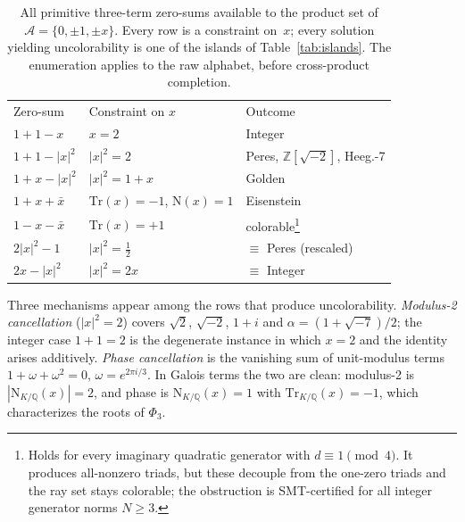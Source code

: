 \documentclass[twocolumn,prl,superscriptaddress,nofootinbib]{revtex4-2}
\newcommand{\Z}{\mathbb{Z}}
\newcommand{\Q}{\mathbb{Q}}
\newcommand{\Norm}{\mathrm{N}}
\newcommand{\Tr}{\mathrm{Tr}}
\begin{document}
\begin{table}[b]
\caption{\label{tab:zerosum}All primitive three-term zero-sums available to the
product set of $\mathcal{A}=\{0,\pm1,\pm x\}$.  Every row is a constraint
on~$x$; every solution yielding uncolorability is one of the islands of
Table~\ref{tab:islands}.  The enumeration applies to the raw alphabet, before
cross-product completion.}
\begin{ruledtabular}
\begin{tabular}{lll}
Zero-sum & Constraint on $x$ & Outcome \\
\colrule
$1+1-x$            & $x=2$                    & Integer \\
$1+1-|x|^2$        & $|x|^2=2$                & Peres, $\Z[\sqrt{-2}]$, Heeg.-7 \\
$1+x-|x|^2$        & $|x|^2=1+x$              & Golden \\
$1+x+\bar x$       & $\Tr(x)=-1$, $\Norm(x)=1$ & Eisenstein \\
$1-x-\bar x$       & $\Tr(x)=+1$              & colorable\footnote{Holds for
every imaginary quadratic generator with $d \equiv 1 \pmod 4$.  It produces
all-nonzero triads, but these decouple from the one-zero triads and the ray set
stays colorable; the obstruction is SMT-certified for all integer generator
norms $N \geq 3$.} \\
$2|x|^2-1$         & $|x|^2=\tfrac12$         & $\equiv$ Peres (rescaled) \\
$2x-|x|^2$         & $|x|^2=2x$               & $\equiv$ Integer \\
\end{tabular}
\end{ruledtabular}
\end{table}

Three mechanisms appear among the rows that produce uncolorability.
\emph{Modulus-2 cancellation} ($|x|^2=2$) covers $\sqrt2$, $\sqrt{-2}$, $1+i$ and
$\alpha=(1+\sqrt{-7})/2$; the integer case $1+1=2$ is the degenerate instance in
which $x=2$ and the identity arises additively.  \emph{Phase cancellation} is the
vanishing sum of unit-modulus terms $1+\omega+\omega^2=0$, $\omega=e^{2\pi i/3}$.
In Galois terms the two are clean: modulus-2 is
$|\Norm_{K/\Q}(x)|=2$, and phase is $\Norm_{K/\Q}(x)=1$ with
$\Tr_{K/\Q}(x)=-1$, which characterizes the roots of $\Phi_3$.
\end{document}
